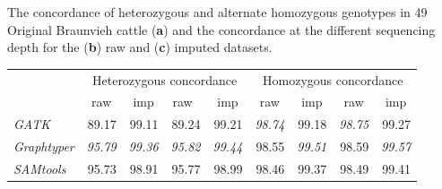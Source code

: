 \documentclass[../main.tex]{subfiles}
\begin{document}
\begin{flushleft}
\begin{landscape}
The concordance of heterozygous and alternate homozygous genotypes in 49 Original Braunvieh cattle (\textbf{a}) and the concordance at the different sequencing depth for the (\textbf{b}) raw and (\textbf{c}) imputed datasets. \\

\bigskip
\bigskip
\bigskip

    
    \centering
    \begin{tabular}{|l|r|r|r|r|r|r|r|r|} 
    \cline{2-9}
    \multicolumn{1}{l|}{} & \multicolumn{4}{c|}{Heterozygous concordance}                                                              & \multicolumn{4}{c|}{Homozygous concordance}                                                                \\ 
    \cline{2-9}
    \multicolumn{1}{c|}{} & \multicolumn{1}{c|}{raw} & \multicolumn{1}{c|}{imp} & \multicolumn{1}{c|}{raw~} & \multicolumn{1}{c|}{imp} & \multicolumn{1}{c|}{raw} & \multicolumn{1}{c|}{imp} & \multicolumn{1}{c|}{raw} & \multicolumn{1}{c|}{imp}  \\ 
    \hline
    \textit{GATK}         & 89.17                    & 99.11                    & 89.24                     & 99.21                    & \textit{98.74}           & 99.18                    & \textit{98.75}           & 99.27                     \\ 
    \hline
    \emph{Graphtyper}            & \textit{95.79}           & \textit{99.36}           & \textit{95.82}            & \textit{99.44}           & 98.55                    & \textit{99.51}           & 98.59                    & \textit{99.57}            \\ 
    \hline
    \textit{SAMtools}     & 95.73                    & 98.91                    & 95.77                     & 98.99                    & 98.46                    & 99.37                    & 98.49                    & 99.41                     \\
    \hline
    \end{tabular}
    
    


\end{landscape}
\end{flushleft}
\end{document}
